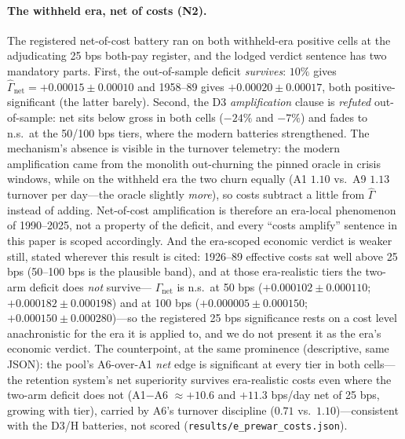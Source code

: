 \documentclass{article}
\begin{document}
\paragraph{The withheld era, net of costs (N2).} The registered
net-of-cost battery ran on both withheld-era positive cells at the
adjudicating 25 bps both-pay register, and the lodged verdict
sentence has two mandatory parts. First, the out-of-sample deficit
\emph{survives}: $10\%$ gives
$\hat\Gamma_{\mathrm{net}} = +0.00015 \pm 0.00010$ and 1958--89
gives $+0.00020 \pm 0.00017$, both positive-significant (the latter
barely). Second, the D3 \emph{amplification} clause is
\emph{refuted} out-of-sample: net sits below gross in both cells
($-24\%$ and $-7\%$) and fades to n.s.\ at the 50/100 bps tiers,
where the modern batteries strengthened. The mechanism's absence is
visible in the turnover telemetry: the modern amplification came
from the monolith out-churning the pinned oracle in crisis windows,
while on the withheld era the two churn equally (A1 $1.10$ vs.\ A9
$1.13$ turnover per day---the oracle slightly \emph{more}), so costs
subtract a little from $\hat\Gamma$ instead of adding.
Net-of-cost amplification is therefore an era-local phenomenon of
1990--2025, not a property of the deficit, and every ``costs
amplify'' sentence in this paper is scoped accordingly. And the
era-scoped economic verdict is weaker still, stated wherever this
result is cited: 1926--89 effective costs sat well above 25 bps
(50--100 bps is the plausible band), and at those era-realistic
tiers the two-arm deficit does \emph{not} survive---%
$\hat\Gamma_{\mathrm{net}}$ is n.s.\ at 50 bps
($+0.000102 \pm 0.000110$; $+0.000182 \pm 0.000198$) and at 100 bps
($+0.000005 \pm 0.000150$; $+0.000150 \pm 0.000280$)---so the
registered 25 bps significance rests on a cost level anachronistic
for the era it is applied to, and we do not present it as the era's
economic verdict. The counterpoint, at the same prominence
(descriptive, same JSON): the pool's A6-over-A1 \emph{net} edge is
significant at every tier in both cells---the retention system's
net superiority survives era-realistic costs even where the
two-arm deficit does not (A1$-$A6
${\approx}{+}10.6$ and ${+}11.3$ bps/day net of 25 bps, growing
with tier), carried by
A6's turnover discipline ($0.71$ vs.\ $1.10$)---consistent with the
D3/H batteries, not scored (\texttt{results/e\_prewar\_costs.json}).
\end{document}
